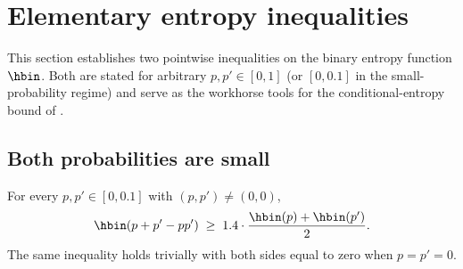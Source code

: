 \section{Elementary entropy inequalities}
\label{sec:elementary}

This section establishes two pointwise inequalities on the binary entropy
function $\hbin$. Both are stated for arbitrary $p, p' \in [0,1]$ (or
$[0, 0.1]$ in the small-probability regime) and serve as the workhorse
tools for the conditional-entropy bound of .

\subsection*{Both probabilities are small}

\begin{lemma}\label{lem:hbin-low}
For every $p, p' \in [0, 0.1]$ with $(p, p') \ne (0, 0)$,
\begin{align}\label{eq:hbin-low}
\hbin(p + p' - p p') \;\ge\; 1.4 \cdot \frac{\hbin(p) + \hbin(p')}{2}.
\end{align}
The same inequality holds trivially with both sides equal to zero when
$p = p' = 0$.
\end{lemma}

